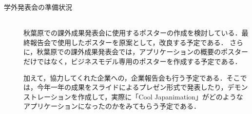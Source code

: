 \begin{description}
\item[学外発表会の準備状況]\mbox{}\\ 
秋葉原での課外成果発表会に使用するポスターの作成を検討している．最終報告会で使用したポスターを原案として，改良する予定である．
さらに，秋葉原での課外成果発表会では，アプリケーションの概要のポスターだけではなく，ビジネスモデル専用のポスターを作成する予定である．
\par
加えて，協力してくれた企業への，企業報告会も行う予定である．そこでは，今年一年の成果をスライドによるプレゼン形式で発表したり，デモンストレーションを作成して，実際に「Cool Japanimation」がどのようなアプリケーションになったのかをみてもらう予定である．

\end{description}
